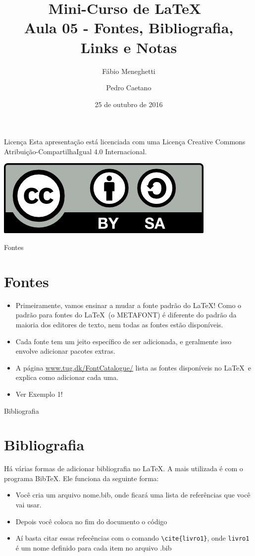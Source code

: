 \documentclass[12pt]{beamer}
\title{Mini-Curso de \LaTeX\ \\ Aula 05 - Fontes, Bibliografia, Links e Notas}
\author{Fábio Meneghetti \and Pedro Caetano}
\date{25 de outubro de 2016}
\begin{document}
\begin{frame}
  \titlepage
\end{frame}

\begin{frame}{Licença}
  Esta apresentação está licenciada com uma Licença Creative Commons Atribuição-CompartilhaIgual 4.0 Internacional.
  \begin{center}
    \includegraphics[scale=0.3]{../license.png}
  \end{center}
\end{frame}

\begin{frame}
  \tableofcontents
\end{frame}

\begin{frame}{Fontes}
  \section{Fontes}
  \begin{itemize}
    \item Primeiramente, vamos ensinar a mudar a fonte padrão do \LaTeX! Como o padrão para fontes do \LaTeX\ (o METAFONT) é diferente do padrão da maioria dos editores de texto, nem todas as fontes estão disponíveis.
    \item Cada fonte tem um jeito específico de ser adicionada, e geralmente isso envolve adicionar pacotes extras.
    \item A página \url{www.tug.dk/FontCatalogue/} lista as fontes disponíveis no \LaTeX\ e explica como adicionar cada uma.
    \item Ver Exemplo 1!
  \end{itemize}
\end{frame}

\begin{frame}[fragile]{Bibliografia}
  \section{Bibliografia}
  Há várias formas de adicionar bibliografia no \LaTeX. A mais utilizada é com o programa BibTeX. Ele funciona da seguinte forma:
  \begin{itemize}
    \item Você cria um arquivo nome.bib, onde ficará uma lista de referências que você vai usar.
    \item Depois você coloca no fim do documento o código \verb++
    \item Aí basta citar essas refecências com o comando \verb+\cite{livro1}+, onde \verb+livro1+ é um nome definido para cada item no arquivo .bib
  \end{itemize}
\end{frame}
\end{document}

